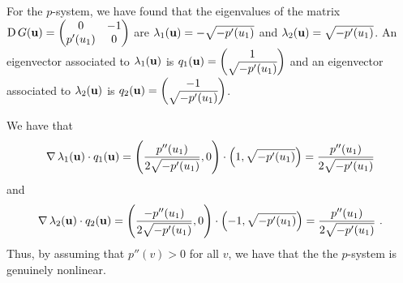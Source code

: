 
\begin{egg}  \label{eggPsystem3}
For the $p$-system, we have found that the eigenvalues of the matrix
$\displaystyle \operatorname{D} G(\mathbf{u}) = \begin{pmatrix} 0 & -1 \\
p'(u_1) & 0 \end{pmatrix}$ are
$\lambda_1(\mathbf{u}) = -\sqrt{-p'(u_1)}$ and
$\lambda_2(\mathbf{u}) = \sqrt{-p'(u_1)}$.  An eigenvector associated to 
$\lambda_1(\mathbf{u})$ is
$\displaystyle q_1(\mathbf{u}) = \begin{pmatrix} 1 \\ \sqrt{-p'(u_1)}
\end{pmatrix}$ and an eigenvector associated to
$\lambda_2(\mathbf{u})$ is
$\displaystyle q_2(\mathbf{u}) = \begin{pmatrix} -1 \\ \sqrt{-p'(u_1)}
\end{pmatrix}$.

We have that 
\[
\operatorname{\nabla} \lambda_1(\mathbf{u}) \cdot q_1(\mathbf{u}) =
\left( \frac{p''(u_1)}{2 \sqrt{-p'(u_1)}} , 0 \right)
\cdot \left( 1 , \sqrt{-p'(u_1)} \right) = \frac{p''(u_1)}{2 \sqrt{-p'(u_1)}} 
\]
and
\[
\operatorname{\nabla} \lambda_2(\mathbf{u}) \cdot q_2(\mathbf{u}) =
\left( \frac{-p''(u_1)}{2 \sqrt{-p'(u_1)}} , 0 \right)
\cdot \left( -1 , \sqrt{-p'(u_1)} \right) = \frac{p''(u_1)}{2 \sqrt{-p'(u_1)}} 
\ .
\]
Thus, by assuming that $p''(v) >0$ for all $v$, we have that the
the $p$-system is genuinely nonlinear.
\end{egg}

